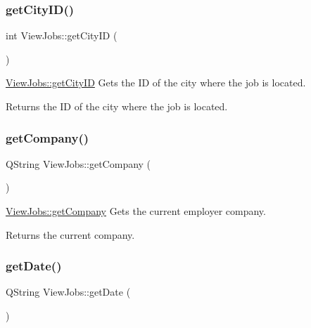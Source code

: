 \subsubsection{\texorpdfstring{get\+City\+I\+D()}{getCityID()}}
{\footnotesize\ttfamily int View\+Jobs\+::get\+City\+ID (\begin{DoxyParamCaption}{ }\end{DoxyParamCaption})}



\hyperlink{class_view_jobs_adcafeca350b21a033aa630e042ee7947}{View\+Jobs\+::get\+City\+ID} Gets the ID of the city where the job is located. 

\begin{DoxyReturn}{Returns}
the ID of the city where the job is located. 
\end{DoxyReturn}
\mbox{\label{class_view_jobs_a88d7c0a7a79bc7a7e02b524587983bf8}} 
\subsubsection{\texorpdfstring{get\+Company()}{getCompany()}}
{\footnotesize\ttfamily Q\+String View\+Jobs\+::get\+Company (\begin{DoxyParamCaption}{ }\end{DoxyParamCaption})}



\hyperlink{class_view_jobs_a88d7c0a7a79bc7a7e02b524587983bf8}{View\+Jobs\+::get\+Company} Gets the current employer company. 

\begin{DoxyReturn}{Returns}
the current company. 
\end{DoxyReturn}
\mbox{\label{class_view_jobs_af046f9201cc6031e070b4f9b613a35f9}} 
\subsubsection{\texorpdfstring{get\+Date()}{getDate()}}
{\footnotesize\ttfamily Q\+String View\+Jobs\+::get\+Date (\begin{DoxyParamCaption}{ }\end{DoxyParamCaption})}



